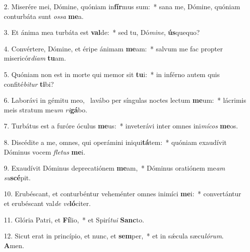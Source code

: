 2. Miserére mei, Dómine, quóniam in\textbf{fír}mus sum:~*  sana me, Dómine, quóniam conturbáta sunt \textit{os}\textit{sa} \textbf{me}a.\

3. Et ánima mea turbáta est \textbf{val}de:~*  sed tu, Dó\textit{mi}\textit{ne}, \textbf{ús}quequo?\

4. Convértere, Dómine, et éripe ánimam \textbf{me}am:~*  salvum me fac propter misericór\textit{di}\textit{am} \textbf{tu}am.\

5. Quóniam non est in morte qui memor sit \textbf{tu}i:~*  in inférno autem quis confité\textit{bi}\textit{tur} \textbf{ti}bi?\

6. Laborávi in gémitu meo, \dag\  lavábo per síngulas noctes lectum \textbf{me}um:~*  lácrimis meis stratum me\textit{um} \textit{ri}\textbf{gá}bo.\

7. Turbátus est a furóre óculus \textbf{me}us:~*  inveterávi inter omnes ini\textit{mí}\textit{cos} \textbf{me}os.\

8. Discédite a me, omnes, qui operámini iniqui\textbf{tá}tem:~*  quóniam exaudívit Dóminus vocem \textit{fle}\textit{tus} \textbf{me}i.\

9. Exaudívit Dóminus deprecatiónem \textbf{me}am,~*  Dóminus oratiónem me\textit{am} \textit{su}\textbf{scé}pit.\

10. Erubéscant, et conturbéntur veheménter omnes inimíci \textbf{me}i:~*  convertántur et erubéscant val\textit{de} \textit{ve}\textbf{ló}citer.\

11. Glória Patri, et \textbf{Fí}lio,~*  et Spirí\textit{tu}\textit{i} \textbf{Sanc}to.\

12. Sicut erat in princípio, et nunc, et \textbf{sem}per,~*  et in sǽcula sæcu\textit{ló}\textit{rum}. \textbf{A}men.\

